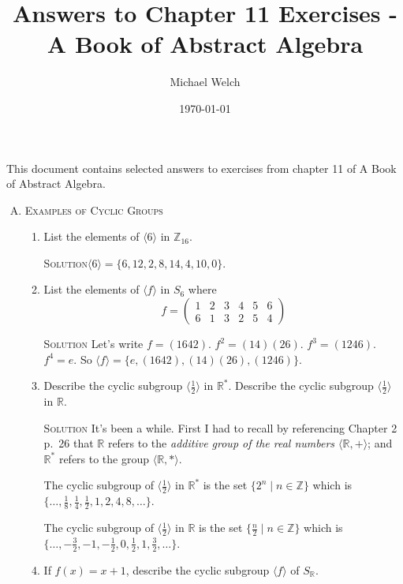 \documentclass[twoside]{amsart}
\newcommand{\Reals}{\ensuremath{\mathbb{R}}\xspace}
\newcommand{\Integers}{\ensuremath{\mathbb{Z}{}}\xspace}
\newcommand{\solution}{\textsc{Solution}\xspace}
\newcommand{\blank}{\vspace{5pt}}
\newcommand{\ind}{\hspace{.35in}}
\newcommand{\itm}{\blank\item}
\newcommand{\sol}{\blank\noindent\solution}
\newcommand{\cgroup}[1]{\langle #1 \rangle}
\begin{document}
\title{Answers to Chapter 11 Exercises - A Book of Abstract Algebra}
\author{Michael Welch}
\date{\today}
\maketitle

This document contains selected answers to exercises from chapter 11
of A Book of Abstract Algebra.


\begin{enumerate}[A.]
   
   \item \textsc{Examples of Cyclic Groups}

   \begin{enumerate}[1)]
      \itm List the elements of $\cgroup{6}$ in $\Integers_{16}$.

      \sol $\cgroup{6} = \{ 6, 12, 2, 8, 14, 4, 10, 0 \}$.

      \itm List the elements of $\cgroup{f}$ in $S_6$ where
      \[
         f = 
            \begin{pmatrix}
               1 & 2 & 3 & 4 & 5 & 6 \\
               6 & 1 & 3 & 2 & 5 & 4
            \end{pmatrix}
      \]

      \sol Let's write $f = (1642)$. $f^2 = (14)(26)$. $f^3 = (1246)$.
      $f^4 = e$. So $\cgroup{f} = \{ e, (1642), (14)(26), (1246) \}$.

      \itm Describe the cyclic subgroup $\cgroup{\frac{1}{2}}$ in 
      $\Reals^*$. Describe the cyclic subgroup $\langle \frac{1}{2} \rangle$
      in $\Reals$.

      \sol It's been a while. First I had to recall by referencing
      Chapter 2 p.~26 that $\Reals$ refers to the \emph{additive group
        of the real numbers $\langle \Reals, +\rangle$}; and
      $\Reals^*$ refers to the group $\langle \Reals, *\rangle$.

      \ind The cyclic subgroup of $\langle \frac{1}{2} \rangle$ in 
      $\Reals^*$ is the set $\{ 2^n \mid n \in \Integers\}$ which is
      $\{\ldots, \frac{1}{8}, \frac{1}{4}, \frac{1}{2}, 1, 2, 4, 8,
      \ldots \}$. 
      
      \ind The cyclic subgroup of $\langle \frac{1}{2} \rangle$ in
      $\Reals$ is the set $\{ \frac{n}{2} \mid n \in \Integers \}$
      which is $\{\ldots, -\frac{3}{2}, -1, -\frac{1}{2}, 0,
      \frac{1}{2}, 1, \frac{3}{2}, \ldots\}$.

      \itm If $f(x) = x + 1$, describe the cyclic subgroup $\langle f
      \rangle$ of $S_\Reals$.


\end{enumerate}
\end{enumerate}
\end{document}
